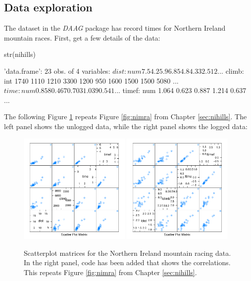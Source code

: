 \subsection*{Data exploration}

The dataset  in the {\em DAAG} package has
record times for Northern Ireland mountain races.  First, get a few
details of the data:
\begin{fullwidth}
\begin{Schunk}
\begin{Sinput}
str(nihills)
\end{Sinput}
\begin{Soutput}
'data.frame':	23 obs. of  4 variables:
 $ dist : num  7.5 4.2 5.9 6.8 5 4.8 4.3 3 2.5 12 ...
 $ climb: int  1740 1110 1210 3300 1200 950 1600 1500 1500 5080 ...
 $ time : num  0.858 0.467 0.703 1.039 0.541 ...
 $ timef: num  1.064 0.623 0.887 1.214 0.637 ...
\end{Soutput}
\end{Schunk}
\end{fullwidth}

The following Figure \ref{fig:nimra-reg} repeats Figure
\ref{fig:nimra} from Chapter \ref{sec:nihills}.
The left panel shows the unlogged data, while the
right panel shows the logged data:
\begin{figure}
\vspace*{-6pt}
\begin{Schunk}


\centerline{\includegraphics[width=0.48\textwidth]{figs/8-splot2-ni-1} \includegraphics[width=0.48\textwidth]{figs/8-splot2-ni-2} }

\end{Schunk}
\caption{Scatterplot matrices for the Northern Ireland mountain racing
  data. In the right panel, code has been added that shows the
  correlations.
This repeats Figure \ref{fig:nimra} from Chapter \ref{sec:nihills}.
\label{fig:nimra-reg}}
\end{figure}

